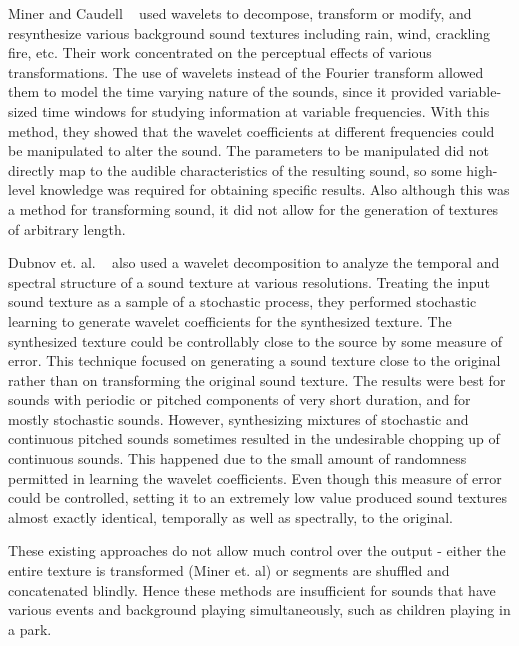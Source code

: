 \documentclass{acmsiggraph}               %
\begin{document}
Miner and Caudell ~ used wavelets to decompose, 
transform or modify, and resynthesize various background sound textures 
including rain, wind, crackling fire, etc. Their work concentrated on 
the perceptual effects of various transformations.
The use of wavelets instead of the Fourier transform allowed them to 
model the time varying nature of the sounds, since it provided 
variable-sized time windows for studying information at variable 
frequencies. With this method, they showed that the wavelet coefficients 
at different frequencies could be manipulated to alter the sound.  The 
parameters to be manipulated did not directly map to the audible 
characteristics of the resulting sound, so some high-level knowledge was 
required for obtaining specific results. Also although this was a method for 
transforming sound, it did not allow for the generation of textures of 
arbitrary length. 

Dubnov et. al. ~ also used a wavelet decomposition to 
analyze the temporal and spectral structure of a sound texture at various 
resolutions. Treating the input sound texture as a sample of a 
stochastic process, they performed stochastic learning to generate 
wavelet coefficients for the synthesized texture. The synthesized texture 
could be controllably close to the source by some measure of error. This 
technique focused on generating a sound texture close to the original 
rather than on transforming the original sound texture. The results were 
best for sounds with periodic or pitched components of very short 
duration, and for mostly stochastic sounds. However, synthesizing 
mixtures of stochastic and continuous pitched sounds sometimes resulted 
in the undesirable chopping up of continuous sounds. This happened due 
to the small amount of randomness permitted in learning the wavelet 
coefficients. Even though this measure of error could be controlled, 
setting it to an extremely low value produced sound textures almost 
exactly identical, temporally as well as spectrally, to the original.

These existing approaches do not allow much control over the output - 
either the entire texture is transformed (Miner et. al) or segments are 
shuffled and concatenated blindly. Hence these methods are insufficient 
for sounds that have various events and background playing 
simultaneously, such as children playing in a park.
\end{document}
